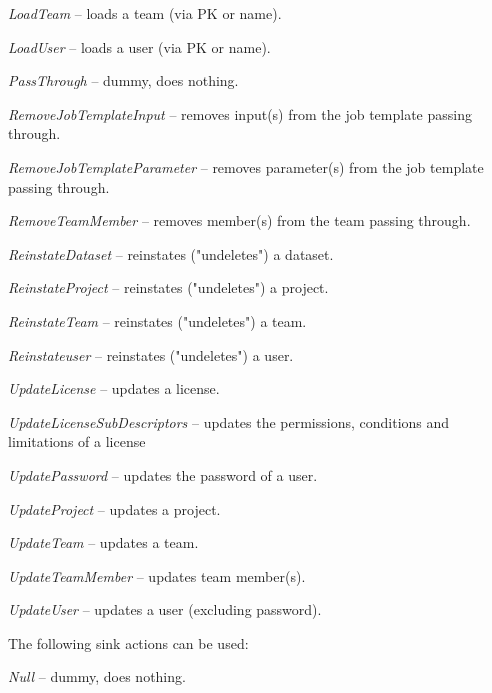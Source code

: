 \documentclass[a4paper]{book}
\begin{document}
\begin{tight_itemize}
  \item \textit{LoadTeam} -- loads a team (via PK or name).
  \item \textit{LoadUser} -- loads a user (via PK or name).
  \item \textit{PassThrough} -- dummy, does nothing.
  \item \textit{RemoveJobTemplateInput} -- removes input(s) from the job template passing through.
  \item \textit{RemoveJobTemplateParameter} -- removes parameter(s) from the job template passing through.
  \item \textit{RemoveTeamMember} -- removes member(s) from the team passing through.
  \item \textit{ReinstateDataset} -- reinstates ("undeletes") a dataset.
  \item \textit{ReinstateProject} -- reinstates ("undeletes") a project.
  \item \textit{ReinstateTeam} -- reinstates ("undeletes") a team.
  \item \textit{Reinstateuser} -- reinstates ("undeletes") a user.
  \item \textit{UpdateLicense} -- updates a license.
  \item \textit{UpdateLicenseSubDescriptors} -- updates the permissions, conditions and limitations of a license
  \item \textit{UpdatePassword} -- updates the password of a user.
  \item \textit{UpdateProject} -- updates a project.
  \item \textit{UpdateTeam} -- updates a team.
  \item \textit{UpdateTeamMember} -- updates team member(s).
  \item \textit{UpdateUser} -- updates a user (excluding password).
\end{tight_itemize}
The following sink actions can be used:
\begin{tight_itemize}
  \item \textit{Null} -- dummy, does nothing.
\end{tight_itemize}
\end{document}
